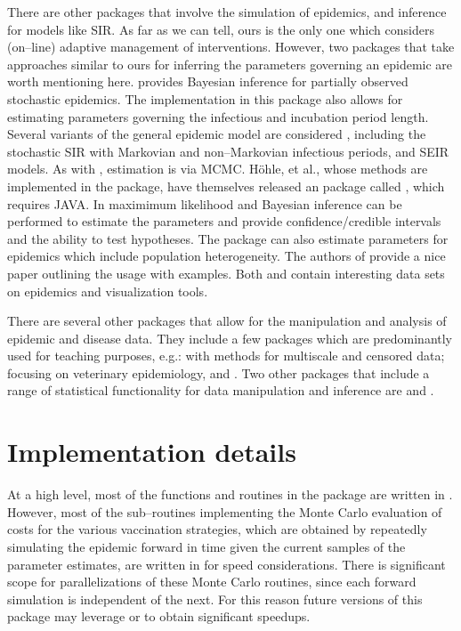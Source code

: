 \documentclass[shortnames,nojss]{jss}
\begin{document}
There are other  packages that involve the simulation of
epidemics, and inference for models like SIR.  As far as we can tell,
ours is the only one which considers (on--line) adaptive management of
interventions.  However, two packages that take approaches similar to
ours for inferring the parameters governing an epidemic are worth
mentioning here.   \citep{stochasticGEM:R} provides
Bayesian inference for partially observed stochastic epidemics.  The
implementation in this package also allows for estimating parameters
governing the infectious and incubation period length.  Several
variants of the general epidemic model are considered
\citep[e.g.,][]{gibson98,hohle05,oneill99,oneill01,oneill02,streftaris04},
including the stochastic SIR with Markovian and non--Markovian
infectious periods, and SEIR models. As with , estimation is
via MCMC.  H\"ohle, et al., whose methods are implemented in the
 package, have themselves released an 
package called  \citep{RLadyBug:R}, which requires {\sf
  JAVA}. In  maximimum likelihood and Bayesian inference
can be performed to estimate the parameters and provide
confidence/credible intervals and the ability to test hypotheses. The
package can also estimate parameters for epidemics which include
population heterogeneity. The authors of  provide a nice
paper outlining the usage \citep{hohle07} with examples.  Both
 and  contain interesting data sets
on epidemics and visualization tools.

There are several other  packages that allow for the
manipulation and analysis of epidemic and disease data.  They include
a few packages which are predominantly used for teaching purposes,
e.g.:  \citep{Epi:R} with methods for multiscale and censored
data;  \citep{epiR:R} focusing on veterinary epidemiology,
and  \citep{epibasix:R}.  Two other packages that include
a range of statistical functionality for data manipulation and
inference are \citep{epicalc:R} and 
\citep{epitools:R}.

\appendix

\section{Implementation details}

At a high level, most of the functions and routines in the 
package are written in .  However, most of the sub--routines
implementing the Monte Carlo evaluation of costs for the various
vaccination strategies, which are obtained by repeatedly simulating
the epidemic forward in time given the current samples of the
parameter estimates, are written in  for speed
considerations.  There is significant scope for parallelizations of
these Monte Carlo routines, since each forward simulation is
independent of the next.  For this reason future versions of this
package may leverage  or  to obtain significant
speedups.
\end{document}
